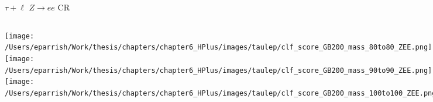 \documentclass[aspectratio=169,xcolor=table]{beamer}
\begin{document}
    \begin{frame}[t]{$\tau+\ell$ $Z \rightarrow ee$ CR}
      \begin{columns}[t]
          \texttt{[image: /Users/eparrish/Work/thesis/chapters/chapter6\_HPlus/images/taulep/clf\_score\_GB200\_mass\_80to80\_ZEE.png]}
          \texttt{[image: /Users/eparrish/Work/thesis/chapters/chapter6\_HPlus/images/taulep/clf\_score\_GB200\_mass\_90to90\_ZEE.png]}
          \texttt{[image: /Users/eparrish/Work/thesis/chapters/chapter6\_HPlus/images/taulep/clf\_score\_GB200\_mass\_100to100\_ZEE.png]}

          \texttt{[image: /Users/eparrish/Work/thesis/chapters/chapter6\_HPlus/images/taulep/clf\_score\_GB200\_mass\_110to110\_ZEE.png]}
          \texttt{[image: /Users/eparrish/Work/thesis/chapters/chapter6\_HPlus/images/taulep/clf\_score\_GB200\_mass\_120to120\_ZEE.png]}
          \texttt{[image: /Users/eparrish/Work/thesis/chapters/chapter6\_HPlus/images/taulep/clf\_score\_GB200\_mass\_130to130\_ZEE.png]}
          \texttt{[image: /Users/eparrish/Work/thesis/chapters/chapter6\_HPlus/images/taulep/clf\_score\_GB200\_mass\_140to140\_ZEE.png]}
          \texttt{[image: /Users/eparrish/Work/thesis/chapters/chapter6\_HPlus/images/taulep/clf\_score\_GB200\_mass\_150to150\_ZEE.png]}
          \texttt{[image: /Users/eparrish/Work/thesis/chapters/chapter6\_HPlus/images/taulep/clf\_score\_GB200\_mass\_160to160\_ZEE.png]}

          \texttt{[image: /Users/eparrish/Work/thesis/chapters/chapter6\_HPlus/images/taulep/clf\_score\_GB200\_mass\_170to170\_ZEE.png]}
          \texttt{[image: /Users/eparrish/Work/thesis/chapters/chapter6\_HPlus/images/taulep/clf\_score\_GB200\_mass\_180to180\_ZEE.png]}
          \texttt{[image: /Users/eparrish/Work/thesis/chapters/chapter6\_HPlus/images/taulep/clf\_score\_GB200\_mass\_190to190\_ZEE.png]}

      \end{columns}
    \end{frame}
\end{document}
